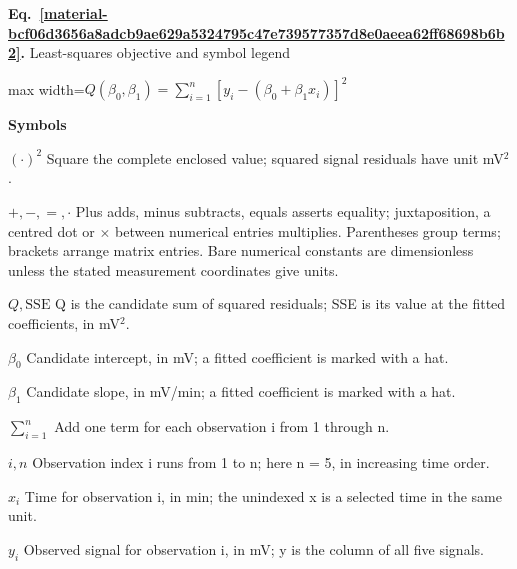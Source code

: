 \documentclass[11pt,a4paper]{article}
\begin{document}
\par\medskip
\noindent\begin{minipage}{\linewidth}
\label{material-bcf06d3656a8adcb9ae629a5324795c47e739577357d8e0aeea62ff68698b6b2}
\noindent\textbf{Eq.~\ref*{material-bcf06d3656a8adcb9ae629a5324795c47e739577357d8e0aeea62ff68698b6b2}.} Least-squares objective and symbol legend\par\nopagebreak
\begin{center}\begin{adjustbox}{max width=\linewidth}$\displaystyle Q(\beta_0,\beta_1)=\sum_{i=1}^{n}[y_i-(\beta_0+\beta_1x_i)]^2$\end{adjustbox}\end{center}

\par\noindent\textbf{Symbols}

\par\noindent\textbf{\(({\cdot})^2\)} Square the complete enclosed value; squared signal residuals have unit mV\ensuremath{{}^2}.

\par\noindent\textbf{\(+,-,=,\cdot\)} Plus adds, minus subtracts, equals asserts equality; juxtaposition, a centred dot or \ensuremath{\times} between numerical entries multiplies. Parentheses group terms; brackets arrange matrix entries. Bare numerical constants are dimensionless unless the stated measurement coordinates give units.

\par\noindent\textbf{\(Q,\mathrm{SSE}\)} Q is the candidate sum of squared residuals; SSE is its value at the fitted coefficients, in mV\ensuremath{{}^2}.

\par\noindent\textbf{\(\beta_0\)} Candidate intercept, in mV; a fitted coefficient is marked with a hat.

\par\noindent\textbf{\(\beta_1\)} Candidate slope, in mV/min; a fitted coefficient is marked with a hat.

\par\noindent\textbf{\(\sum_{i=1}^{n}\)} Add one term for each observation i from 1 through n.

\par\noindent\textbf{\(i,n\)} Observation index i runs from 1 to n; here n = 5, in increasing time order.

\par\noindent\textbf{\(x_i\)} Time for observation i, in min; the unindexed x is a selected time in the same unit.

\par\noindent\textbf{\(y_i\)} Observed signal for observation i, in mV; y is the column of all five signals.

\end{minipage}\par
\medskip
\end{document}
